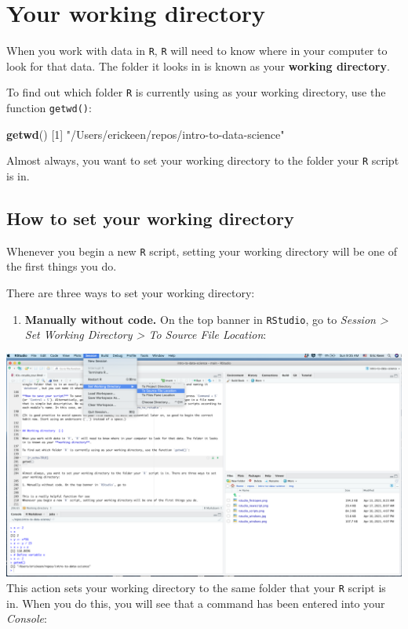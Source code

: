 \documentclass[
]{book}
\newenvironment{Shaded}{\begin{snugshade}}{\end{snugshade}}
\newcommand{\DecValTok}[1]{\textcolor[rgb]{0.00,0.00,0.81}{#1}}
\newcommand{\KeywordTok}[1]{\textcolor[rgb]{0.13,0.29,0.53}{\textbf{#1}}}
\newcommand{\NormalTok}[1]{#1}
\newcommand{\StringTok}[1]{\textcolor[rgb]{0.31,0.60,0.02}{#1}}
\providecommand{\tightlist}{%
  \setlength{\itemsep}{0pt}\setlength{\parskip}{0pt}}
\begin{document}
\hypertarget{wd}{%
\section*{Your working directory}\label{wd}}

When you work with data in \texttt{R}, \texttt{R} will need to know where in your computer to look for that data. The folder it looks in is known as your \textbf{working directory}.

To find out which folder \texttt{R} is currently using as your working directory, use the function \texttt{getwd()}:

\begin{Shaded}
\begin{Highlighting}[]
\KeywordTok{getwd}\NormalTok{()}
\NormalTok{[}\DecValTok{1}\NormalTok{] }\StringTok{"/Users/erickeen/repos/intro-to-data-science"}
\end{Highlighting}
\end{Shaded}

Almost always, you want to set your working directory to the folder your \texttt{R} script is in.

\hypertarget{how-to-set-your-working-directory}{%
\subsection*{How to set your working directory}\label{how-to-set-your-working-directory}}

Whenever you begin a new \texttt{R} script, setting your working directory will be one of the first things you do.

There are three ways to set your working directory:

\begin{enumerate}
\def\labelenumi{\arabic{enumi}.}
\tightlist
\item
  \textbf{Manually without code.} On the top banner in \texttt{RStudio}, go to \emph{Session \textgreater{} Set Working Directory \textgreater{} To Source File Location}:
\end{enumerate}

\includegraphics{img/rstudio_setwd.png}
This action sets your working directory to the same folder that your \texttt{R} script is in. When you do this, you will see that a command has been entered into your \emph{Console}:
\end{document}
